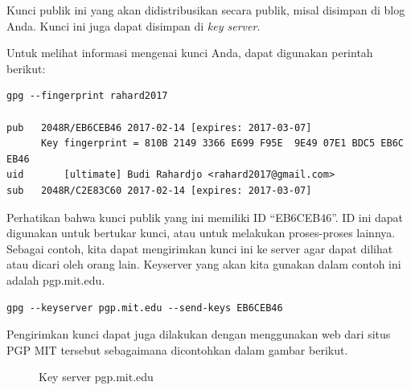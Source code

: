 Kunci publik ini yang akan didistribusikan secara publik, misal disimpan di
blog Anda. Kunci ini juga dapat disimpan di {\em key server}.

Untuk melihat informasi mengenai kunci Anda, dapat digunakan perintah berikut:

\begin{verbatim}
gpg --fingerprint rahard2017

pub   2048R/EB6CEB46 2017-02-14 [expires: 2017-03-07]
      Key fingerprint = 810B 2149 3366 E699 F95E  9E49 07E1 BDC5 EB6C EB46
uid       [ultimate] Budi Rahardjo <rahard2017@gmail.com>
sub   2048R/C2E83C60 2017-02-14 [expires: 2017-03-07]
\end{verbatim}

Perhatikan bahwa kunci publik yang ini memiliki ID ``EB6CEB46''. ID ini dapat
digunakan untuk bertukar kunci, atau untuk melakukan proses-proses lainnya.
Sebagai contoh, kita dapat mengirimkan kunci ini ke server agar dapat dilihat
atau dicari oleh orang lain. Keyserver yang akan kita gunakan dalam contoh ini
adalah pgp.mit.edu.

\begin{verbatim}
gpg --keyserver pgp.mit.edu --send-keys EB6CEB46
\end{verbatim}

Pengirimkan kunci dapat juga dilakukan dengan menggunakan web dari situs PGP
MIT tersebut sebagaimana dicontohkan dalam gambar berikut.

\begin{figure}[ht]
\caption{Key server pgp.mit.edu}
\label{fig:pgp-mit}
\end{figure}


